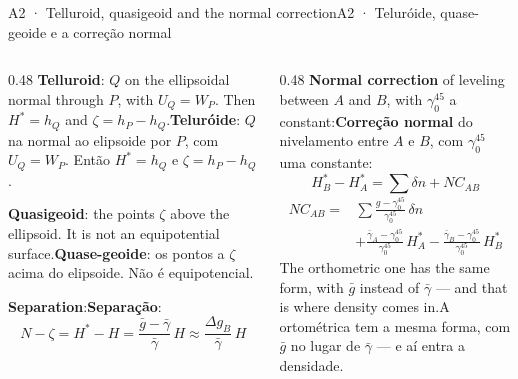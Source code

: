 \documentclass[aspectratio=169,11pt]{beamer}
\newcommand{\tr}[2]{\ifEN#2\else#1\fi}
\begin{document}
\begin{frame}{\tr{A2 · Teluróide, quase-geoide e a correção normal}{A2 · Telluroid, quasigeoid
  and the normal correction}}
  \small
  \begin{columns}[T]
    \begin{column}{0.48\textwidth}
      \tr{\textbf{Teluróide}: $Q$ na normal ao elipsoide por $P$, com $U_Q = W_P$. Então $H^{*}
      = h_Q$ e $\zeta = h_P - h_Q$.}{\textbf{Telluroid}: $Q$ on the ellipsoidal normal through
      $P$, with $U_Q = W_P$. Then $H^{*} = h_Q$ and $\zeta = h_P - h_Q$.}
      \medskip

      \tr{\textbf{Quase-geoide}: os pontos a $\zeta$ acima do elipsoide. Não é
      equipotencial.}{\textbf{Quasigeoid}: the points $\zeta$ above the ellipsoid. It is not an
      equipotential surface.}
      \medskip

      \tr{\textbf{Separação}:}{\textbf{Separation}:}
      \[ N - \zeta = H^{*} - H = \frac{\bar g - \bar\gamma}{\bar\gamma}\,H \approx
         \frac{\Delta g_B}{\bar\gamma}\,H \]
    \end{column}
    \begin{column}{0.48\textwidth}
      \tr{\textbf{Correção normal} do nivelamento entre $A$ e $B$, com $\gamma_0^{45}$ uma
      constante:}{\textbf{Normal correction} of leveling between $A$ and $B$, with
      $\gamma_0^{45}$ a constant:}
      \[ H^{*}_B - H^{*}_A = \sum \delta n + NC_{AB} \]
      \begin{align*}
        NC_{AB} = {}& \sum \frac{g - \gamma_0^{45}}{\gamma_0^{45}}\,\delta n \\
        & + \frac{\bar\gamma_A - \gamma_0^{45}}{\gamma_0^{45}}\,H^{*}_A
          - \frac{\bar\gamma_B - \gamma_0^{45}}{\gamma_0^{45}}\,H^{*}_B
      \end{align*}
      \tr{A ortométrica tem a mesma forma, com $\bar g$ no lugar de $\bar\gamma$ --- e aí
      entra a densidade.}{The orthometric one has the same form, with $\bar g$ instead of
      $\bar\gamma$ --- and that is where density comes in.}
    \end{column}
  \end{columns}
\end{frame}
\end{document}
